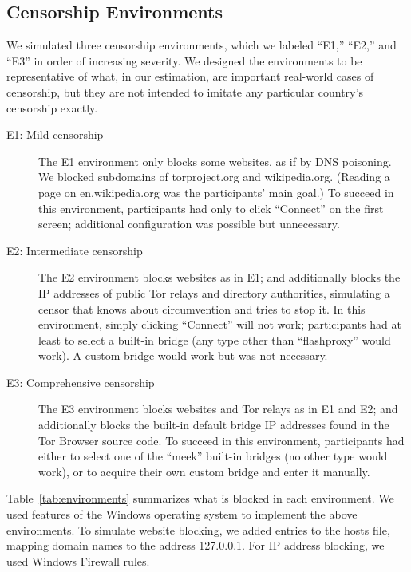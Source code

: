\documentclass[USenglish,oneside,twocolumn]{article}
\begin{document}
\subsection{Censorship Environments}
\label{sec:environments}
We simulated three censorship environments,
which we labeled ``E1,'' ``E2,'' and ``E3''
in order of increasing severity.
We designed the environments to be representative
of what, in our estimation, are important real-world
cases of censorship, but they are not intended to imitate
any particular country's censorship exactly.

\smallskip

\begin{description}
\item[E1: Mild censorship]
The E1 environment only blocks some websites,
as if by DNS poisoning.
We blocked subdomains of torproject.org
and wikipedia.org.
(Reading a page on en.wikipedia.org was the participants' main goal.)
To succeed in this environment,
participants had only to click ``Connect'' on the first screen;
additional configuration was possible but unnecessary.

\item[E2: Intermediate censorship]
The E2 environment blocks websites as in E1;
and additionally blocks the IP addresses of public Tor relays
and directory authorities, simulating a censor that knows
about circumvention and tries to stop it.
In this environment, simply clicking ``Connect'' will not work;
participants had at least to select a built-in bridge
(any type other than ``flashproxy'' would work).
A custom bridge would work but was not necessary.

\item[E3: Comprehensive censorship]
The E3 environment blocks websites and Tor relays as in E1 and E2;
and additionally blocks the built-in default bridge IP addresses
found in the Tor Browser source code.
To succeed in this environment, participants had either to select
one of the ``meek'' built-in bridges (no other type would work),
or to acquire their own custom bridge and enter it manually.
\end{description}

\smallskip

Table~\ref{tab:environments} summarizes what is blocked
in each environment.
We used features of the Windows operating system to implement
the above environments.
To simulate website blocking, we added entries to the hosts file,
mapping domain names to the address 127.0.0.1.
For IP address blocking, we used Windows Firewall rules.
\end{document}
